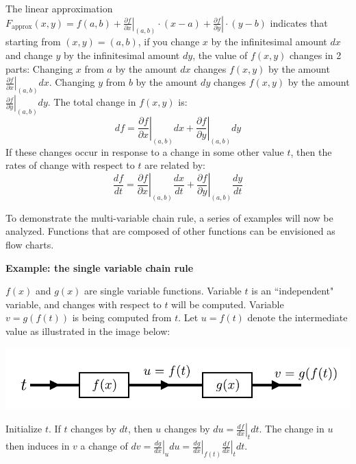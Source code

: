 \documentclass{article}
\begin{document}
The linear approximation \(F_{\text{approx}}(x, y) = f(a, b) + \left.\frac{\partial f}{\partial x}\right|_{(a,b)} \cdot (x - a) + \left.\frac{\partial f}{\partial y}\right| \cdot (y - b)\) indicates that starting from \((x, y) = (a, b)\), if you change \(x\) by the infinitesimal amount \(dx\) and change \(y\) by the infinitesimal amount \(dy\), the value of \(f(x, y)\) changes in 2 parts: Changing \(x\) from \(a\) by the amount \(dx\) changes \(f(x, y)\) by the amount \(\left.\frac{\partial f}{\partial x}\right|_{(a, b)} dx\). Changing \(y\) from \(b\) by the amount \(dy\) changes \(f(x, y)\) by the amount \(\left.\frac{\partial f}{\partial y}\right|_{(a, b)} dy\). The total change in \(f(x, y)\) is:
\[df = \left.\frac{\partial f}{\partial x}\right|_{(a, b)} dx + \left.\frac{\partial f}{\partial y}\right|_{(a, b)} dy\]
If these changes occur in response to a change in some other value \(t\), then the rates of change with respect to \(t\) are related by:
\[\frac{df}{dt} = \left.\frac{\partial f}{\partial x}\right|_{(a, b)} \frac{dx}{dt} + \left.\frac{\partial f}{\partial y}\right|_{(a, b)} \frac{dy}{dt}\]

To demonstrate the multi-variable chain rule, a series of examples will now be analyzed. Functions that are composed of other functions can be envisioned as flow charts.



\vspace{5mm}

\textbf{Example: the single variable chain rule}

\(f(x)\) and \(g(x)\) are single variable functions. Variable \(t\) is an ``independent" variable, and changes with respect to \(t\) will be computed. Variable \(v = g(f(t))\) is being computed from \(t\). Let \(u = f(t)\) denote the intermediate value as illustrated in the image below:

\begin{center}
\includegraphics[scale = 1.0]{single_variable_chain_rule}
\end{center}

Initialize \(t\). If \(t\) changes by \(dt\), then \(u\) changes by \(du = \left.\frac{df}{dx}\right|_t dt\). The change in \(u\) then induces in \(v\) a change of \(dv = \left.\frac{dg}{dx}\right|_u du = \left.\frac{dg}{dx}\right|_{f(t)} \left.\frac{df}{dx}\right|_t dt\).
\end{document}

